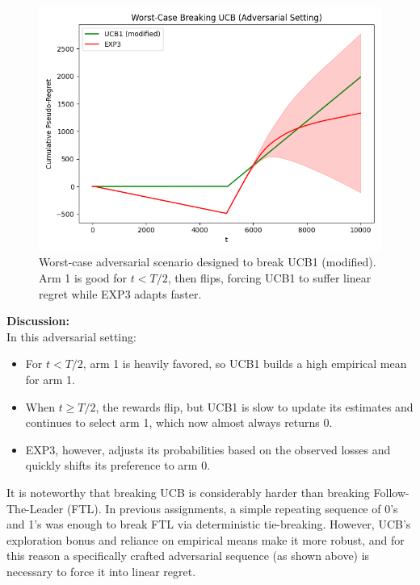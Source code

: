 \begin{figure}[H]
    \centering
    \includegraphics[width=1\textwidth]{Code/break_experiment_worst_case.png}
    \caption{Worst-case adversarial scenario designed to break UCB1 (modified). Arm 1 is good for $t < T/2$, then flips, forcing UCB1 to suffer linear regret while EXP3 adapts faster.}
\end{figure}

\bigskip
\textbf{Discussion:} \\
In this adversarial setting:
\begin{itemize}
    \item For $t < T/2$, arm 1 is heavily favored, so UCB1 builds a high empirical mean for arm 1.
    \item When $t \ge T/2$, the rewards flip, but UCB1 is slow to update its estimates and continues to select arm 1, which now almost always returns 0.
    \item EXP3, however, adjusts its probabilities based on the observed losses and quickly shifts its preference to arm 0.
\end{itemize}

It is noteworthy that breaking UCB is considerably harder than breaking Follow-The-Leader (FTL). In previous assignments, a simple repeating sequence of 0's and 1's was enough to break FTL via deterministic tie-breaking. However, UCB's exploration bonus and reliance on empirical means make it more robust, and for this reason a specifically crafted adversarial sequence (as shown above) is necessary to force it into linear regret.